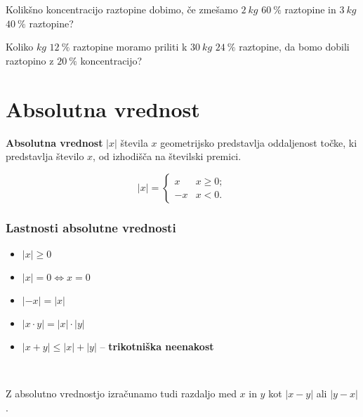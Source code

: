                 \begin{naloga}
                    Kolikšno koncentracijo raztopine dobimo, če zmešamo $2~kg$ $60~\%$ raztopine in $3~kg$ $40~\%$ raztopine? 
                \end{naloga}
    
                \begin{naloga}
                    Koliko $kg$ $12~\%$ raztopine moramo priliti k $30~kg$ $24~\%$ raztopine, da bomo dobili raztopino z $20~\%$ koncentracijo? 
                \end{naloga}
            



\newpage

\section{Absolutna vrednost}

        
            \textbf{Absolutna vrednost} $|x|$ števila $x$ geometrijsko predstavlja oddaljenost točke, 
            ki predstavlja število $x$, od izhodišča na številski premici.
        

       
            $$|x|=\begin{cases} x &x\geq 0; \\ -x & x<0. \end{cases}$$
        

        \subsubsection*{Lastnosti absolutne vrednosti}
                    \begin{itemize}
                        \item $|x|\geq 0$
                        \item $|x|=0 \Leftrightarrow x=0$
                        \item $|-x|=|x|$
                        \item $|x\cdot y|=|x|\cdot|y|$
                        \item $|x+y|\leq |x|+|y|$ -- \textbf{trikotniška neenakost}
                    \end{itemize}

        ~

        
            Z absolutno vrednostjo izračunamo tudi razdaljo med $x$ in $y$ kot $|x-y|$ ali $|y-x|$.
        
    ~~~\\


